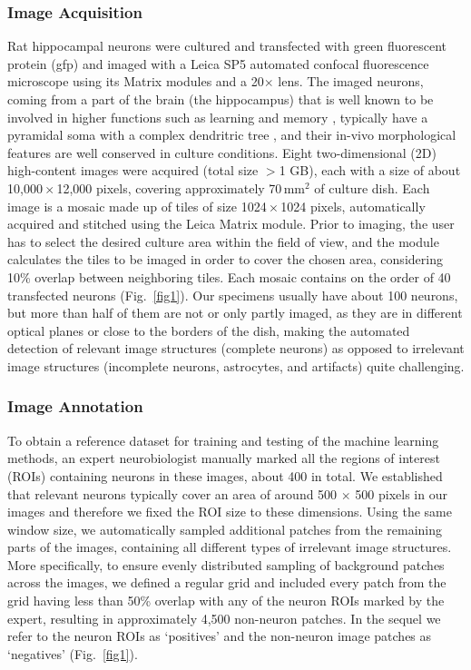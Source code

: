 \subsubsection{Image Acquisition}
\label{sec:acquisition}
Rat hippocampal neurons were cultured and transfected with green fluorescent protein (\gls{gfp}) and imaged with a Leica SP5 automated confocal fluorescence microscope using its Matrix modules and a 20$\times$ lens. The imaged neurons, coming from a part of the brain (the hippocampus) that is well known to be involved in higher functions such as learning and memory \cite{squire1992memory}, typically have a pyramidal soma with a complex dendritric tree \cite{goslin1998rat}, and their in-vivo morphological features are well conserved in culture conditions. Eight two-dimensional (2D) high-content images were acquired (total size $>$1 GB), each with a size of about 10,000\,$\times$\,12,000 pixels, covering approximately 70\,mm${}^2$ of culture dish. Each image is a mosaic made up of tiles of size 1024\,$\times$\,1024 pixels, automatically acquired and stitched using the Leica Matrix module. Prior to imaging, the user has to select the desired culture area within the field of view, and the module calculates the tiles to be imaged in order to cover the chosen area, considering 10\% overlap between neighboring tiles. Each mosaic contains on the order of 40 transfected neurons (Fig.\ \ref{fig1}). Our specimens usually have about 100 neurons, but more than half of them are not or only partly imaged, as they are in different optical planes or close to the borders of the dish, making the automated detection of relevant image structures (complete neurons) as opposed to irrelevant image structures (incomplete neurons, astrocytes, and artifacts) quite challenging.

\subsubsection{Image Annotation}
\label{sec:annotation}

To obtain a reference dataset for training and testing of the machine learning methods, an expert neurobiologist manually marked all the regions of interest (ROIs) containing neurons in these images, about 400 in total. We established that relevant neurons typically cover an area of around 500 $\times$ 500 pixels in our images and therefore we fixed the ROI size to these dimensions. Using the same window size, we automatically sampled additional patches from the remaining parts of the images, containing all different types of irrelevant image structures. More specifically, to ensure evenly distributed sampling of background patches across the images, we defined a regular grid and included every patch from the grid having less than 50\% overlap with any of the neuron ROIs marked by the expert, resulting in approximately 4,500 non-neuron patches. In the sequel we refer to the neuron ROIs as `positives' and the non-neuron image patches as `negatives' (Fig.~\ref{fig1}).

